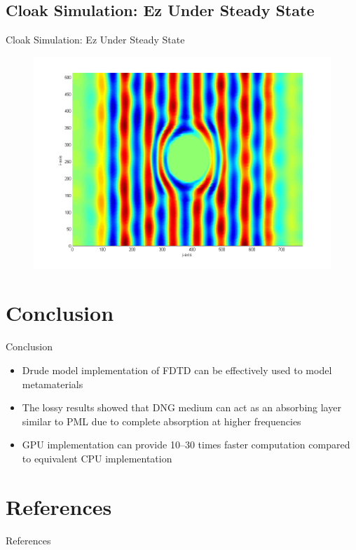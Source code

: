 \documentclass{beamer}
\begin{document}
\subsection{Cloak Simulation: Ez Under Steady State}
\begin{frame}{Cloak Simulation: Ez Under Steady State}
\begin{figure}[H]
\centering
\vspace{-0.325cm}
\includegraphics[scale=0.325]{Figures/FigCh05_Ez_Cloak_SteadyStateLossless.png}
\label{fig:Ez-Cloak-SteadyStateLossless}
\end{figure}
\end{frame}
\section{Conclusion}
\begin{frame}{Conclusion}
	\begin{itemize}
	\item Drude model implementation of FDTD can be effectively used to model metamaterials
	\item The lossy results showed that DNG medium can act as an absorbing layer similar to PML due to complete absorption at higher frequencies
	\item GPU implementation can provide 10--30 times faster computation compared to equivalent CPU implementation
	\end{itemize}
\end{frame}

\section{References}
\begin{frame}[t,allowframebreaks]{References}
	\nocite{*}
	{\tiny }
\end{frame}
\end{document}
